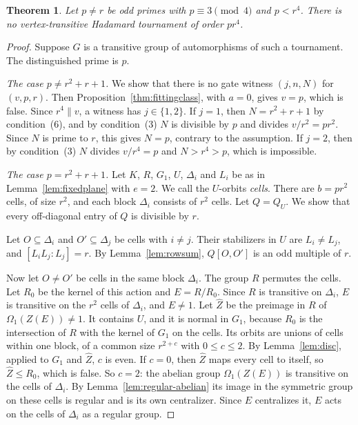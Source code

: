\documentclass[11pt]{amsart}
\newtheorem{theorem}{Theorem}
\theoremstyle{definition}
\theoremstyle{remark}
\begin{document}
\begin{theorem}\label{thm:pr4}
Let $p\ne r$ be odd primes with $p\equiv3\pmod4$ and $p<r^4$. There is no vertex-transitive Hadamard tournament of order $pr^4$.
\end{theorem}
\begin{proof}
Suppose $G$ is a transitive group of automorphisms of such a tournament. The distinguished prime is $p$.

\emph{The case $p\ne r^2+r+1$.} We show that there is no gate witness $(j,n,N)$ for $(v,p,r)$. Then Proposition~\ref{thm:fittingclass}, with $a=0$, gives $v=p$, which is false. Since $r^4\parallel v$, a witness has $j\in\{1,2\}$. If $j=1$, then $N=r^2+r+1$ by condition~(6), and by condition~(3) $N$ is divisible by $p$ and divides $v/r^2=pr^2$. Since $N$ is prime to $r$, this gives $N=p$, contrary to the assumption. If $j=2$, then by condition~(3) $N$ divides $v/r^4=p$ and $N>r^4>p$, which is impossible.

\emph{The case $p=r^2+r+1$.} Let $K$, $R$, $G_1$, $U$, $\Delta_i$ and $L_i$ be as in Lemma~\ref{lem:fixedplane} with $e=2$. We call the $U$-orbits \emph{cells}. There are $b=pr^2$ cells, of size $r^2$, and each block $\Delta_i$ consists of $r^2$ cells. Let $Q=Q_U$. We show that every off-diagonal entry of $Q$ is divisible by $r$.

Let $O\subseteq\Delta_i$ and $O'\subseteq\Delta_j$ be cells with $i\ne j$. Their stabilizers in $U$ are $L_i\ne L_j$, and $[L_iL_j:L_j]=r$. By Lemma~\ref{lem:rowsum}, $Q[O,O']$ is an odd multiple of $r$.

Now let $O\ne O'$ be cells in the same block $\Delta_i$. The group $R$ permutes the cells. Let $R_0$ be the kernel of this action and $E=R/R_0$. Since $R$ is transitive on $\Delta_i$, $E$ is transitive on the $r^2$ cells of $\Delta_i$, and $E\ne1$. Let $\hat Z$ be the preimage in $R$ of $\Omega_1(Z(E))\ne1$. It contains $U$, and it is normal in $G_1$, because $R_0$ is the intersection of $R$ with the kernel of $G_1$ on the cells. Its orbits are unions of cells within one block, of a common size $r^{2+c}$ with $0\le c\le2$. By Lemma~\ref{lem:disc}, applied to $G_1$ and $\hat Z$, $c$ is even. If $c=0$, then $\hat Z$ maps every cell to itself, so $\hat Z\le R_0$, which is false. So $c=2$: the abelian group $\Omega_1(Z(E))$ is transitive on the cells of $\Delta_i$. By Lemma~\ref{lem:regular-abelian} its image in the symmetric group on these cells is regular and is its own centralizer. Since $E$ centralizes it, $E$ acts on the cells of $\Delta_i$ as a regular group.


\end{proof}
\end{document}
